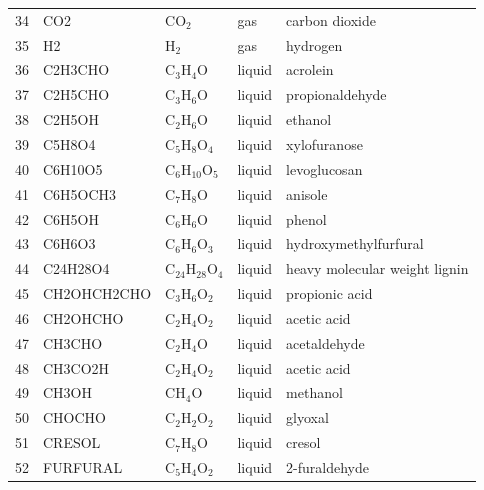 \begin{center}
\begin{longtable}{cllll}
    34 & CO2            & CO$_2$                  & \cellcolor{purple!25}gas         & carbon dioxide \\
    35 & H2             & H$_2$                   & \cellcolor{purple!25}gas         & hydrogen \\
    36 & C2H3CHO        & C$_3$H$_4$O             & \cellcolor{blue!25}liquid        & acrolein \\
    37 & C2H5CHO        & C$_3$H$_6$O             & \cellcolor{blue!25}liquid        & propionaldehyde \\
    38 & C2H5OH         & C$_2$H$_6$O             & \cellcolor{blue!25}liquid        & ethanol \\
    39 & C5H8O4         & C$_5$H$_8$O$_4$         & \cellcolor{blue!25}liquid        & xylofuranose \\
    40 & C6H10O5        & C$_6$H$_{10}$O$_5$      & \cellcolor{blue!25}liquid        & levoglucosan \\
    41 & C6H5OCH3       & C$_7$H$_8$O             & \cellcolor{blue!25}liquid        & anisole \\
    42 & C6H5OH         & C$_6$H$_6$O             & \cellcolor{blue!25}liquid        & phenol \\
    43 & C6H6O3         & C$_6$H$_6$O$_3$         & \cellcolor{blue!25}liquid        & hydroxymethylfurfural \\
    44 & C24H28O4       & C$_{24}$H$_{28}$O$_4$   & \cellcolor{blue!25}liquid        & heavy molecular weight lignin \\
    45 & CH2OHCH2CHO    & C$_3$H$_6$O$_2$         & \cellcolor{blue!25}liquid        & propionic acid \\
    46 & CH2OHCHO       & C$_2$H$_4$O$_2$         & \cellcolor{blue!25}liquid        & acetic acid \\
    47 & CH3CHO         & C$_2$H$_4$O             & \cellcolor{blue!25}liquid        & acetaldehyde \\
    48 & CH3CO2H        & C$_2$H$_4$O$_2$         & \cellcolor{blue!25}liquid        & acetic acid \\
    49 & CH3OH          & CH$_4$O                 & \cellcolor{blue!25}liquid        & methanol \\
    50 & CHOCHO         & C$_2$H$_2$O$_2$         & \cellcolor{blue!25}liquid        & glyoxal \\
    51 & CRESOL         & C$_7$H$_8$O             & \cellcolor{blue!25}liquid        & cresol \\
    52 & FURFURAL       & C$_5$H$_4$O$_2$         & \cellcolor{blue!25}liquid        & 2-furaldehyde \\

\end{longtable}
\end{center}
